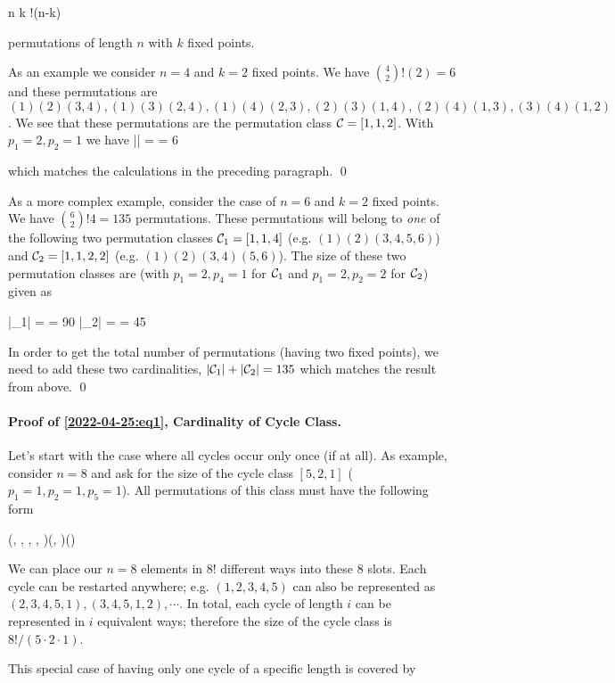 \bee
{n \choose k} !(n-k)
\eee

permutations of length $n$ with $k$ fixed points.

As an example we consider $n=4$ and $k=2$ fixed points. We have ${4 \choose 2} !(2) = 6$ and these permutations are $(1)(2)(3,4), (1)(3)(2,4), (1)(4)(2,3), (2)(3)(1,4), (2)(4)(1,3), (3)(4)(1,2)$. We see that these permutations are the permutation class $\mathcal{C} = [1,1,2]$. With $p_1=2, p_2=1$ we have
\bee
|\Cc| =  = 6
\eee

which matches the calculations in the preceding paragraph. \qed

As a more complex example, consider the case of $n=6$ and $k=2$ fixed points. We have ${6 \choose 2} !4 = 135$ permutations. These permutations will belong to \emph{one} of the following two permutation classes $\mathcal{C}_1 = [1,1,4]$ (e.g. $(1)(2)(3,4,5,6)$) and $\mathcal{C}_2 = [1,1,2,2]$ (e.g. $(1)(2)(3,4)(5,6)$).
The size of these two permutation classes are (with $p_1=2, p_4=1$ for $\mathcal{C}_1$ and $p_1=2, p_2=2$ for $\mathcal{C}_2$) given as

\bee
|\Cc_1| =  = 90 \quad |\Cc_2| =  = 45
\eee

In order to get the total number of permutations (having two fixed points), we need to add these two cardinalities, $|\mathcal{C}_1| + |\mathcal{C}_2| = 135$ which matches the result from above. \qed

\paragraph{Proof of \eqref{2022-04-25:eq1}, Cardinality of Cycle Class.} Let's start with the case where all cycles occur only once (if at all). As example, consider $n=8$ and ask for the size of the cycle class $[5, 2, 1]$ ($p_1=1, p_2=1, p_5=1$). All permutations of this class must have the following form

\bee
(\cdot, \cdot, \cdot, \cdot, \cdot)(\cdot, \cdot)(\cdot)
\eee

We can place our $n=8$ elements in $8!$ different ways into these 8 slots. Each cycle can be restarted anywhere; e.g. $(1,2,3,4,5)$ can also be represented as $(2,3,4,5,1), (3,4,5,1,2), \cdots$. In total, each cycle of length $i$ can be represented in $i$ equivalent ways; therefore the size of the cycle class is $8! / (5 \cdot 2 \cdot 1)$.

This special case of having only one cycle of a specific length is covered by

